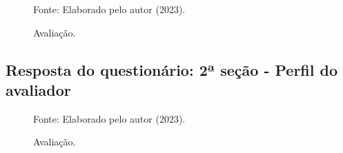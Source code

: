 \documentclass[
	12pt,				%
	openright,			%
	oneside,			%
	a4paper,			%
	english,			%
	french,				%
	spanish,			%
	brazil,				%
	]{abntex2}
\begin{document}
\begin{figure}[ht]
    \centering
    \caption{Avaliação.}
    \label{fig: grafico-acc}
    
    \centering \small Fonte: Elaborado pelo autor (2023).
\end{figure}





 \subsection{Resposta do questionário: 2ª seção - Perfil do avaliador}

\begin{figure}[ht]
    \centering
    \caption{Avaliação.}
    \label{fig: grafico-acc}
    
    \centering \small Fonte: Elaborado pelo autor (2023).
\end{figure}
\end{document}
